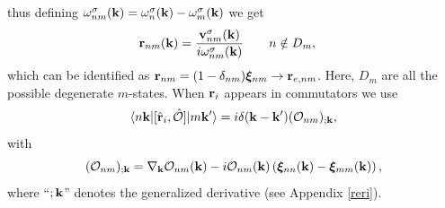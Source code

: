 \documentclass[floatfix,prb,aps,superscriptaddress,11pt,preprint,letterpaper]{revtex4}
\begin{document}
thus defining $\omega^\sigma_{nm}(\mathbf{k})=\omega^\sigma_n(\mathbf{k})-\omega^\sigma_m(\mathbf{k})$ we get
\begin{align}\label{pmnrmn}
\mathbf{r}_{nm}(\mathbf{k})
&=
\frac{\mathbf{v}^\sigma_{nm}(\mathbf{k})}{i\omega^\sigma_{nm}(\mathbf{k})}
\quad\quad n\notin D_m
,
\end{align} 
which can be identified as 
$\mathbf{r}_{nm}=(1-\delta_{nm})\boldsymbol{\xi}_{nm}\to \mathbf{r}_{e,nm}$.
Here, $D_m$ are all the possible degenerate $m$-states.
When $\mathbf{r}_i$ appears in
commutators we use\cite{aversaPRB95} 
\begin{equation}\label{conmri3n}
\langle n\mathbf{k} |[\hat{\mathbf{r}}_i,\hat{{\cal O}}]| m\mathbf{k}' \rangle
=i\delta(\mathbf{k}-\mathbf{k}')({\cal O}_{nm})_{;\mathbf{k}}
,
\end{equation}  
with
\begin{equation}\label{gendevnn}
({\cal O}_{nm})_{;\mathbf{k}}=
\nabla_{\mathbf{k}}
{\cal O}_{n m}(\mathbf{k})
- 
i
{\cal O}_{nm}(\mathbf{k})
\left(
\boldsymbol{\xi}_{nn}(\mathbf{k})
-
\boldsymbol{\xi}_{mm}(\mathbf{k})
\right)
,
\end{equation} 
where ``$;\mathbf{k}$'' denotes the generalized derivative (see Appendix \ref{reri}). 
\end{document}

